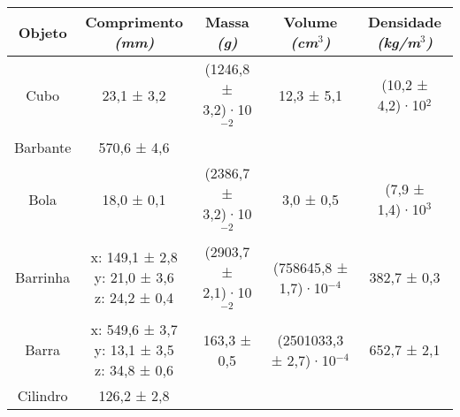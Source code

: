 \documentclass{article}
\begin{document}
\begin{table}[h!]
\centering
\begin{tabular}{c c c c c }
\toprule
Objeto & \shortstack{Comprimento\\\textit{(mm)}} & \shortstack{Massa\\\textit{(g)}} & \shortstack{Volume\\\textit{(cm$^3$)}} & \shortstack{Densidade\\\textit{(kg/m$^3$)}} \\
\midrule
Cubo & 23,1 ± 3,2 & (1246,8 ± 3,2)·10$^{-2}$ & 12,3 ± 5,1 & (10,2 ± 4,2)·10$^{2}$\\[5pt]
Barbante & 570,6 ± 4,6 & & & \\[5pt]
Bola & 18,0 ± 0,1 & (2386,7 ± 3,2)·10$^{-2}$ & 3,0 ± 0,5 & (7,9 ± 1,4)·10$^{3}$\\[5pt]
Barrinha & \shortstack{x: 149,1 ± 2,8\\y: 21,0 ± 3,6\\z: 24,2 ± 0,4} & (2903,7 ± 2,1)·10$^{-2}$ & (758645,8 ± 1,7)·10$^{-4}$ & 382,7 ± 0,3\\[5pt]
Barra & \shortstack{x: 549,6 ± 3,7\\y: 13,1 ± 3,5\\z: 34,8 ± 0,6} & 163,3 ± 0,5 & (2501033,3 ± 2,7)·10$^{-4}$ & 652,7 ± 2,1\\[5pt]
Cilindro & 126,2 ± 2,8 & & & \\[5pt]
\bottomrule
\end{tabular}
\end{table}
\end{document}
